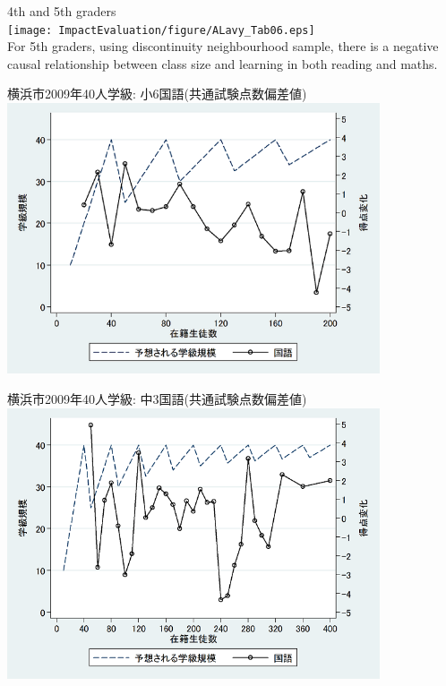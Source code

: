 \begin{frame}[t]{}
4th and 5th graders\\
\hfil\texttt{[image: ImpactEvaluation/figure/ALavy\_Tab06.eps]}\\
For 5th graders, using discontinuity neighbourhood sample, there is a negative causal relationship between class size and learning in both reading and maths.\\
\vspace{-4.7cm}\hspace{2.5cm}\hspace{-.1cm}
\end{frame}


\begin{frame}{}
横浜市2009年40人学級: 小6国語(共通試験点数偏差値)\\
\hfil\includegraphics[width = 11cm]{ImpactEvaluation/figure/Akabayashi_ClassSizeYokohamaShou6.png}\\
\citet{Akabayashi2013}
\end{frame}

\begin{frame}{}
横浜市2009年40人学級: 中3国語(共通試験点数偏差値)\\
\hfil\includegraphics[width = 11cm]{ImpactEvaluation/figure/Akabayashi_ClassSizeYokohamaChu3.png}\\
\citet{Akabayashi2013}
\end{frame}

